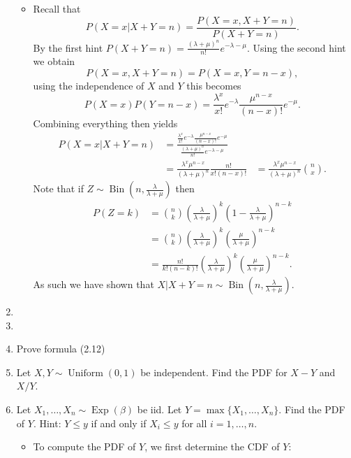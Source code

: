 \documentclass{article}
\begin{document}
\begin{enumerate}
\begin{itemize}
			\item Recall that
			$$
			P(X = x|X + Y = n) = \frac{P(X = x, X + Y = n)}{P(X + Y = n)}.
			$$
			By the first hint $P(X + Y = n) = \frac{(\lambda + \mu)^n}{n!} e^{-\lambda -\mu}$. Using the second hint we obtain
			$$
			P(X = x, X + Y = n) = P(X = x, Y = n - x),
			$$
			using the independence of $X$ and $Y$ this becomes
			$$
			P(X = x)P(Y = n - x) = \frac{\lambda^x}{x!} e^{-\lambda} \frac{\mu^{n - x}}{(n - x)!}e^{-\mu}.
			$$
			Combining everything then yields
			$$
			\begin{aligned}
			P(X = x|X + Y = n) &= \frac{\frac{\lambda^x}{x!} e^{-\lambda} \frac{\mu^{n - x}}{(n - x)!}e^{-\mu}}{\frac{(\lambda + \mu)^n}{n!} e^{-\lambda-\mu}} \\
			&= \frac{\lambda^x \mu^{n - x}}{(\lambda + \mu)^n} \frac{n!}{x! (n - x)!}
			&= \frac{\lambda^x \mu^{n - x}}{(\lambda + \mu)^n} \binom{n}{x}.
			\end{aligned}
			$$
			Note that if $Z \sim \operatorname{Bin}\left(n, \frac{\lambda}{\lambda + \mu}\right)$ then
			$$
			\begin{aligned}
			P(Z = k) &= \binom{n}{k} \left(\frac{\lambda}{\lambda + \mu}\right)^k \left( 1 - \frac{\lambda}{\lambda + \mu} \right)^{n - k} \\
			&= \binom{n}{k} \left(\frac{\lambda}{\lambda + \mu}\right)^k \left( \frac{\mu}{\lambda + \mu}\right)^{n - k} \\
			&= \frac{n!}{k!(n - k)!} \left(\frac{\lambda}{\lambda + \mu}\right)^k \left( \frac{\mu}{\lambda + \mu}\right)^{n - k}.
			\end{aligned}
			$$
			As such we have shown that $X|X + Y = n \sim \operatorname{Bin}\left(n, \frac{\lambda}{\lambda + \mu}\right)$.
		\end{itemize}
	\item 
	\item 
	\item Prove formula (2.12)
	\item Let $X, Y \sim \operatorname{Uniform}(0, 1)$ be independent. Find the PDF for $X - Y$ and $X / Y$.
	\item Let $X_1, \dots, X_n \sim \operatorname{Exp}(\beta)$ be iid. Let $Y = \max\{X_1, \dots, X_n\}$. Find the PDF of $Y$. Hint: $Y \leq y$ if and only if $X_i \leq y$ for all $i = 1, \dots, n$.
		\begin{itemize}
			\item To compute the PDF of $Y$, we first determine the CDF of $Y$:
			$$
			\begin{aligned}

\end{aligned}$$
\end{itemize}
\end{enumerate}
\end{document}
